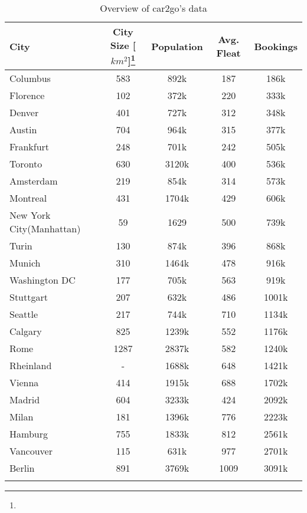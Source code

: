 \begin{table}
	\setlength{\tabcolsep}{2.3pt}
	\centering
	\caption{Overview of car2go's data}
	\begin{tabular}{lcccc}
		\hline
		City &  City Size [$km^2$]\footnote{} & Population \footnotemark[\value{footnote}] &  Avg. Fleat & Bookings\\ 
		\hline
		\hline
		Columbus			  & 583 & 892k & 187 & 186k \\
		Florence 	  			& 102 & 372k & 220 & 333k \\
		Denver 		  			 & 401 & 727k & 312 & 348k \\
		Austin 		   			  & 704 & 964k & 315 & 377k \\
		Frankfurt 			   & 248 & 701k & 242 & 505k \\
		Toronto 				 & 630 & 3120k & 400 & 536k \\
		Amsterdam 			& 219 & 854k & 314 & 573k \\
		Montreal 				& 431 & 1704k & 429 & 606k \\
		New York City(Manhattan) 	   & 59 & 1629 & 500 & 739k \\
		Turin 					    & 130 & 874k & 396 & 868k \\
		Munich 					 & 310 & 1464k & 478 & 916k \\
		Washington DC 	  & 177 & 705k & 563 & 919k \\
		Stuttgart 				 & 207 & 632k & 486 & 1001k \\
		Seattle 				   & 217 & 744k & 710 & 1134k \\
		Calgary 				  & 825 & 1239k & 552 & 1176k \\
		Rome 					  & 1287 & 2837k & 582 & 1240k \\
		Rheinland 			   &  - & 1688k & 648 & 1421k \\
		Vienna 					  & 414 & 1915k & 688 & 1702k \\
		Madrid 					 & 604 & 3233k & 424 & 2092k \\
		Milan 					   & 181 & 1396k & 776 & 2223k \\
		Hamburg 			  & 755 & 1833k & 812 & 2561k \\
		Vancouver 			 & 115 & 631k & 977 & 2701k \\
		Berlin 					  & 891 & 3769k & 1009 & 3091k \\
		\hline
		\label{tab:2_3_datasummary}
	\end{tabular}
\end{table}

